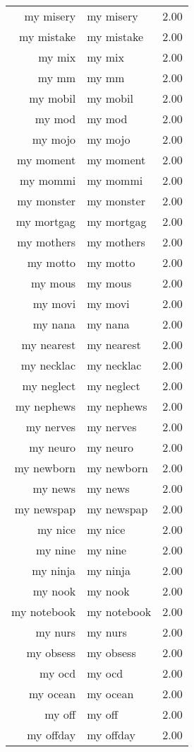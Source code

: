 \begin{table}[ht]
\begin{tabular}{rlr}
  my misery & my misery & 2.00 \\ 
  my mistake & my mistake & 2.00 \\ 
  my mix & my mix & 2.00 \\ 
  my mm & my mm & 2.00 \\ 
  my mobil & my mobil & 2.00 \\ 
  my mod & my mod & 2.00 \\ 
  my mojo & my mojo & 2.00 \\ 
  my moment & my moment & 2.00 \\ 
  my mommi & my mommi & 2.00 \\ 
  my monster & my monster & 2.00 \\ 
  my mortgag & my mortgag & 2.00 \\ 
  my mothers & my mothers & 2.00 \\ 
  my motto & my motto & 2.00 \\ 
  my mous & my mous & 2.00 \\ 
  my movi & my movi & 2.00 \\ 
  my nana & my nana & 2.00 \\ 
  my nearest & my nearest & 2.00 \\ 
  my necklac & my necklac & 2.00 \\ 
  my neglect & my neglect & 2.00 \\ 
  my nephews & my nephews & 2.00 \\ 
  my nerves & my nerves & 2.00 \\ 
  my neuro & my neuro & 2.00 \\ 
  my newborn & my newborn & 2.00 \\ 
  my news & my news & 2.00 \\ 
  my newspap & my newspap & 2.00 \\ 
  my nice & my nice & 2.00 \\ 
  my nine & my nine & 2.00 \\ 
  my ninja & my ninja & 2.00 \\ 
  my nook & my nook & 2.00 \\ 
  my notebook & my notebook & 2.00 \\ 
  my nurs & my nurs & 2.00 \\ 
  my obsess & my obsess & 2.00 \\ 
  my ocd & my ocd & 2.00 \\ 
  my ocean & my ocean & 2.00 \\ 
  my off & my off & 2.00 \\ 
  my offday & my offday & 2.00 \\ 

\end{tabular}
\end{table}
